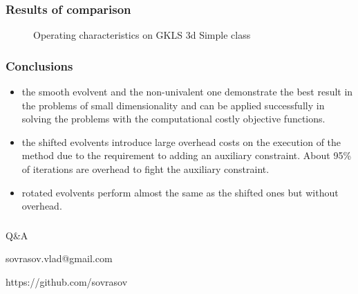\documentclass[aspectratio=1610]{beamer}
\begin{document}
\begin{frame}
  \frametitle{Results of comparison}
  \begin{figure}[ht]
    \hspace*{-0.9cm}
    \caption{Operating characteristics on GKLS 3d Simple class}
  \end{figure}
\end{frame}


\begin{frame}
  \frametitle{Conclusions}
    \begin{itemize}
      \item the smooth evolvent and the non-univalent one demonstrate the best result in the problems of small dimensionality and can be applied successfully in solving the problems with the computational costly objective functions.
      \item the shifted evolvents introduce large overhead costs on the execution of the method due to the requirement to adding an auxiliary constraint. About 95\% of iterations are overhead to fight the auxiliary constraint.
      \item rotated evolvents perform almost the same as the shifted ones but without overhead.
    \end{itemize}
\end{frame}

\begin{frame}{{}}
  \frametitle{ }
  \begin{center}
    \Large{Q\&A}

\vspace{1cm}

    sovrasov.vlad@gmail.com

    https://github.com/sovrasov
  \end{center}
\end{frame}
\end{document}
